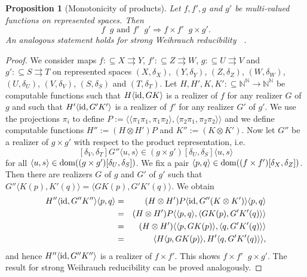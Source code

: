 \documentclass[jsl,10pt]{noasl}
\def\IN{{\mathbb{N}}}
\def\TO{\Longrightarrow}
\def\In{\subseteq}
\def\mto{\rightrightarrows}
\def\id{{\rm id}}
\def\dom{{\rm dom}}
\def\leqW{\mathop{\leq_{\mathrm{W}}}}
\def\leqSW{\mathop{\leq_{\mathrm{sW}}}}
\newtheorem{proposition}{Proposition}[section]
\begin{document}
\begin{proposition}[Monotonicity of products]
\label{prop:monotone}
Let $f,f',g$ and $g'$ be mul\-ti-valued functions on represented spaces. Then
\[f\leqW g\mbox{ and }f'\leqW g'\TO f\times f'\leqW g\times g'.\]
An analogous statement holds for strong Weihrauch reducibility $\leqSW$.
\end{proposition}
\begin{proof}
We consider maps $f:\In X\mto Y$, $f':\In Z\mto W$, $g:\In U\mto V$ and $g':\In S\mto T$
on represented spaces $(X,\delta_X)$, $(Y,\delta_Y)$, $(Z,\delta_Z)$, $(W,\delta_W)$, $(U,\delta_U)$, $(V,\delta_V)$,
$(S,\delta_S)$ and $(T,\delta_T)$.
Let $H,H',K,K':\In\IN^\IN\to\IN^\IN$ be computable functions such that
$H\langle\id,GK\rangle$ is a realizer of $f$ for any realizer $G$ of $g$ 
and such that $H'\langle\id,G'K'\rangle$ is a realizer of $f'$ for any realizer $G'$ of $g'$.
We use the projections $\pi_i$ to define
$P:=\langle\langle\pi_1\pi_1,\pi_1\pi_2\rangle,\langle\pi_2\pi_1,\pi_2\pi_2\rangle\rangle$
and we define computable functions $H'':=(H\otimes H')P$ and $K'':=(K\otimes K')$.
Now let $G''$ be a realizer of $g\times g'$ with respect to the product representation, i.e.\
\[[\delta_V,\delta_T]G''\langle u,s\rangle\in (g\times g')[\delta_U,\delta_S]\langle u,s\rangle\]
for all $\langle u,s\rangle\in\dom((g\times g')[\delta_U,\delta_S])$.
We fix a pair $\langle p,q\rangle\in\dom((f\times f')[\delta_X,\delta_Z])$.
Then there are realizers $G$ of $g$ and $G'$ of $g'$ such that $G''\langle K(p),K'(q)\rangle=\langle GK(p),G'K'(q)\rangle$.
We obtain
\begin{eqnarray*}
H''\langle\id,G''K''\rangle\langle p,q\rangle
&=& (H\otimes H')P\langle\id,G''(K\otimes K')\rangle\langle p,q\rangle\\
&=& (H\otimes H')P\langle\langle p,q\rangle,\langle GK(p),G'K'(q)\rangle\rangle\\
&=& (H\otimes H')\langle\langle p,GK(p)\rangle,\langle q,G'K'(q)\rangle\rangle\\
&=& \langle H\langle p,GK(p)\rangle,H'\langle q,G'K'(q)\rangle\rangle,
\end{eqnarray*}
and hence $H''\langle\id,G''K''\rangle$ is a realizer of $f\times f'$. 
This shows $f\times f'\leqW g\times g'$.
The result for strong Weihrauch reducibility can be proved analogously.
\end{proof}
\end{document}
